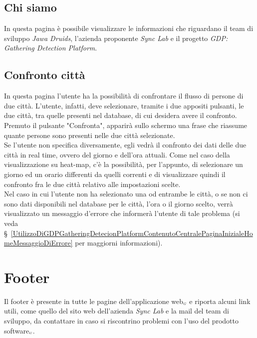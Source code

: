 \subsection{Chi siamo} \label{UtilizzoDiGDPGatheringDetecionPlatformContenutoCentraleChiSiamo}
In questa pagina è possibile visualizzare le informazioni che riguardano il team di sviluppo \textit{Jawa Druids}, l'azienda proponente \textit{Sync Lab} e il progetto \textit{GDP: Gathering Detection Platform}. 


\subsection{Confronto città} \label{UtilizzoDiGDPGatheringDetecionPlatformContenutoCentralePaginaInizialeHomeBottoneConfrontoCitta}
In questa pagina l'utente ha la possibilità di confrontare il flusso di persone di due città. L'utente, infatti, deve selezionare, tramite i due appositi pulsanti, le due città, tra quelle presenti nel database, di cui desidera avere il confronto. \\
 Premuto il pulsante "Confronta", apparirà sullo schermo una frase che riassume quante persone sono presenti nelle due città selezionate. \\
 Se l'utente non specifica diversamente, egli vedrà il confronto dei dati delle due città in real time, ovvero del giorno e dell'ora attuali. Come nel caso della visualizzazione su heat-map, c'è la possibilità, per l'appunto, di selezionare un giorno ed un orario differenti da quelli correnti e di visualizzare quindi il confronto fra le due città relativo alle impostazioni scelte. \\
 Nel caso in cui l'utente non ha selezionato una od entrambe le città, o se non ci sono dati disponibili nel database per le città, l'ora o il giorno scelto, verrà visualizzato un messaggio d'errore che informerà l'utente di tale problema (si veda \S~\ref{UtilizzoDiGDPGatheringDetecionPlatformContenutoCentralePaginaInizialeHomeMessaggioDiErrore} per maggiorni informazioni).

\section{Footer}\label{UtilizzoDiGDPGatheringDetecionPlatformFooter}
Il footer è presente in tutte le pagine dell'applicazione web$_{\scaleto{G}{3pt}}$ e riporta alcuni link utili, come quello del sito web dell'azienda \textit{Sync Lab} e la mail del team di sviluppo, da contattare in caso si riscontrino problemi con l'uso del prodotto software$_{\scaleto{G}{3pt}}$. 
